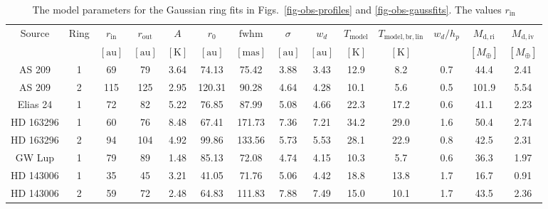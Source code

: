 \documentclass{aa}
\begin{document}
\begin{table*}
\begin{center}
\begin{tabular}{|cc|cc|ccccc|ccccc|}
\hline
\hline
Source & Ring & $r_{\mathrm{in}}$ & $r_{\mathrm{out}}$ & $A$ & $r_0$ & $\mathrm{fwhm}$ & $\sigma$ & $w_d$ & $T_{\mathrm{model}}$ & $T_{\mathrm{model,br,lin}}$ & $w_d/h_p$ & $M_{\mathrm{d,ri}}$ & $M_{\mathrm{d,iv}}$\\
            & & $[\mathrm{au}]$ & $[\mathrm{au}]$ & $[\mathrm{K}]$ & $[\mathrm{au}]$ & $[\mathrm{mas}]$ & $[\mathrm{au}]$ & $[\mathrm{au}]$ & $\mathrm{[K]}$ & $\mathrm{[K]}$ &  & $[M_{\oplus}]$ & $[M_{\oplus}]$\\
\hline
AS 209     & 1 &  69 &  79 &   3.64 &  74.13 &  75.42 &   3.88 &   3.43 &  12.9 &   8.2 &   0.7 &  44.4 &   2.41\\
AS 209     & 2 & 115 & 125 &   2.95 & 120.31 &  90.28 &   4.64 &   4.28 &  10.1 &   5.6 &   0.5 & 101.9 &   5.54\\
Elias 24   & 1 &  72 &  82 &   5.22 &  76.85 &  87.99 &   5.08 &   4.66 &  22.3 &  17.2 &   0.6 &  41.1 &   2.23\\
HD 163296  & 1 &  60 &  76 &   8.48 &  67.41 & 171.73 &   7.36 &   7.21 &  34.2 &  29.0 &   1.6 &  50.4 &   2.74\\
HD 163296  & 2 &  94 & 104 &   4.92 &  99.86 & 133.56 &   5.73 &   5.53 &  28.1 &  22.9 &   0.8 &  42.5 &   2.31\\
GW Lup     & 1 &  79 &  89 &   1.48 &  85.13 &  72.08 &   4.74 &   4.15 &  10.3 &   5.7 &   0.6 &  36.3 &   1.97\\
HD 143006  & 1 &  35 &  45 &   3.21 &  41.05 &  71.76 &   5.06 &   4.42 &  18.8 &  13.8 &   1.7 &  16.7 &   0.91\\
HD 143006  & 2 &  59 &  72 &   2.48 &  64.83 & 111.83 &   7.88 &   7.49 &  15.0 &  10.1 &   1.7 &  43.5 &   2.36\\
\hline
\hline
\end{tabular}
\end{center}
\caption{\label{tab-gauss-params}The model parameters for the Gaussian ring fits
  in Figs.~\ref{fig-obs-profiles} and \ref{fig-obs-gaussfits}. The values $r_{\mathrm{in}}$
}
\end{table*}
\end{document}
